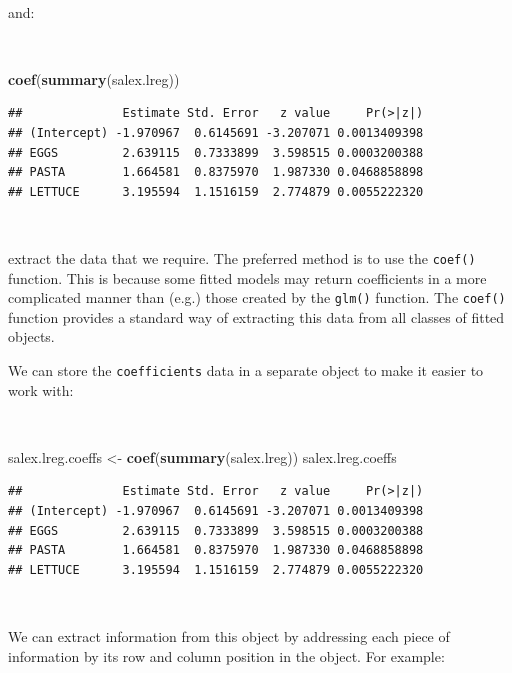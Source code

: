\documentclass[12pt,a4paper]{book}
\newenvironment{Shaded}{\begin{snugshade}}{\end{snugshade}}
\newcommand{\KeywordTok}[1]{\textcolor[rgb]{0.13,0.29,0.53}{\textbf{#1}}}
\newcommand{\StringTok}[1]{\textcolor[rgb]{0.31,0.60,0.02}{#1}}
\newcommand{\NormalTok}[1]{#1}
\theoremstyle{definition}
\theoremstyle{definition}
\theoremstyle{definition}
\theoremstyle{remark}
\begin{document}
~

and:

~

\begin{Shaded}
\begin{Highlighting}[]
\KeywordTok{coef}\NormalTok{(}\KeywordTok{summary}\NormalTok{(salex.lreg))}
\end{Highlighting}
\end{Shaded}

\begin{verbatim}
##              Estimate Std. Error   z value     Pr(>|z|)
## (Intercept) -1.970967  0.6145691 -3.207071 0.0013409398
## EGGS         2.639115  0.7333899  3.598515 0.0003200388
## PASTA        1.664581  0.8375970  1.987330 0.0468858898
## LETTUCE      3.195594  1.1516159  2.774879 0.0055222320
\end{verbatim}

~

extract the data that we require. The preferred method is to use the
\texttt{coef()} function. This is because some fitted models may return
coefficients in a more complicated manner than (e.g.) those created by
the \texttt{glm()} function. The \texttt{coef()} function provides a
standard way of extracting this data from all classes of fitted objects.

\newpage

We can store the \texttt{coefficients} data in a separate object to make
it easier to work with:

~

\begin{Shaded}
\begin{Highlighting}[]
\NormalTok{salex.lreg.coeffs <-}\StringTok{ }\KeywordTok{coef}\NormalTok{(}\KeywordTok{summary}\NormalTok{(salex.lreg))}
\NormalTok{salex.lreg.coeffs}
\end{Highlighting}
\end{Shaded}

\begin{verbatim}
##              Estimate Std. Error   z value     Pr(>|z|)
## (Intercept) -1.970967  0.6145691 -3.207071 0.0013409398
## EGGS         2.639115  0.7333899  3.598515 0.0003200388
## PASTA        1.664581  0.8375970  1.987330 0.0468858898
## LETTUCE      3.195594  1.1516159  2.774879 0.0055222320
\end{verbatim}

~

We can extract information from this object by addressing each piece of
information by its row and column position in the object. For example:
\end{document}
